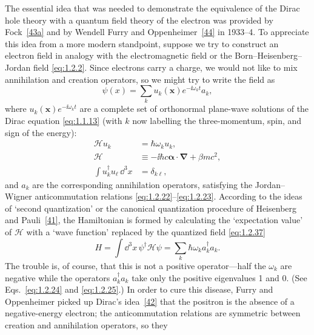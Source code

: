 The essential idea that was needed to demonstrate the equivalence of the
Dirac hole theory with a quantum field theory of the electron was provided by
Fock~\hyperref[ref:1.43a]{[43a]} and by Wendell Furry and Oppenheimer~\hyperref[ref:1.44]{[44]} in 1933--4. To
appreciate this idea from a more modern standpoint, suppose we try to
construct an electron field in analogy with the electromagnetic field or the
Born--Heisenberg--Jordan field \eqref{eq:1.2.2}. Since electrons carry a charge, we
would not like to mix annihilation and creation operators, so we might try to
write the field as
\begin{equation}
  \psi(x)=\sum_k u_k(\mathbf x)e^{-\ii\omega_kt}a_k,
  \tag{1.2.37}\label{eq:1.2.37}
\end{equation}
where $u_k(\mathbf x)e^{-\ii\omega_kt}$ are a complete set of orthonormal
plane-wave solutions of the Dirac equation \eqref{eq:1.1.13} (with $k$ now labelling
the three-momentum, spin, and sign of the energy):
\begin{align}
  \mathcal H u_k&=\hbar\omega_ku_k,
  \tag{1.2.38}\label{eq:1.2.38}\\
  \mathcal H&\equiv-\ii\hbar c\boldsymbol\alpha\cdot\boldsymbol\nabla
    +\beta mc^2,
  \tag{1.2.39}\label{eq:1.2.39}\\
  \int u_k^{\dagger}u_{\ell}\,\dd^3x&=\delta_{k\ell},
  \tag{1.2.40}\label{eq:1.2.40}
\end{align}
and $a_k$ are the corresponding annihilation operators, satisfying the
Jordan--Wigner anticommutation relations \eqref{eq:1.2.22}--\eqref{eq:1.2.23}. According to the
ideas of `second quantization' or the canonical quantization procedure of
Heisenberg and Pauli~\hyperref[ref:1.41]{[41]}, the Hamiltonian is formed by calculating the
`expectation value' of $\mathcal H$ with a `wave function' replaced by the
quantized field \eqref{eq:1.2.37}
\begin{equation}
  H=\int \dd^3x\,\psi^{\dagger}\mathcal H\psi
   =\sum_k\hbar\omega_ka_k^{\dagger}a_k.
  \tag{1.2.41}\label{eq:1.2.41}
\end{equation}
The trouble is, of course, that this is not a positive operator---half the
$\omega_k$ are negative while the operators $a_k^{\dagger}a_k$ take only the
positive eigenvalues 1 and 0. (See Eqs.~\eqref{eq:1.2.24} and \eqref{eq:1.2.25}.) In order to
cure this disease, Furry and Oppenheimer picked up Dirac's idea~\hyperref[ref:1.42]{[42]} that the
positron is the absence of a negative-energy electron; the anticommutation
relations are symmetric between creation and annihilation operators, so they
